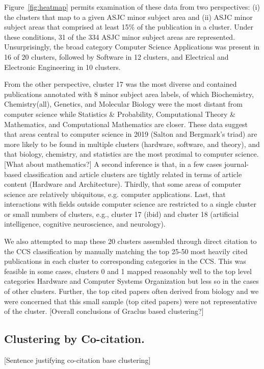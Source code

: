 Figure~\ref{fig:heatmap} permits examination of these data from two perspectives: (i) the clusters that map to a given ASJC minor subject area and (ii) ASJC minor subject areas that comprised at least 15\% of the publication in a cluster. Under these conditions, 31 of the 334 ASJC minor subject areas are represented. Unsurprisingly, the broad category Computer Science Applications was present in 16 of 20 clusters, followed by Software in 12 clusters, and Electrical and Electronic Engineering in 10 clusters. 

From the other perspective, cluster 17 was the most diverse and contained publications annotated with 8 minor subject area labels, of which Biochemistry, Chemistry(all), Genetics, and Molecular Biology were the most distant from computer science while Statistics \& Probability, Computational Theory \& Mathematics, and Computational Mathematics are closer.  These data suggest that areas central to computer science in 2019 (Salton and Bergmark's triad) are more likely to be found in multiple clusters (hardware, software, and theory), and that biology, chemistry, and statistics are the most proximal to computer science. [What about mathematics?]  A second inference is that, in a few cases journal-based classification and article clusters are tightly related in terms of article content (Hardware and Architecture). Thirdly, that some areas of computer science are relatively ubiquitous, e.g. computer applications. Last, that interactions with fields outside computer science are restricted to a single cluster or small numbers of clusters, e.g., cluster 17 (ibid) and cluster 18 (artificial intelligence, cognitive neuroscience, and neurology).

We also attempted to map these 20 clusters assembled through direct citation to the CCS classification by manually matching the top 25-50 most heavily cited publications in each cluster to corresponding categories in the CCS. This was feasible in some cases, clusters 0 and 1 mapped reasonably well to the top level categories Hardware and Computer Systems Organization but less so in the cases of other clusters. Further, the top cited papers often derived from biology and we were concerned that this small sample (top cited papers) were not representative of the cluster. [Overall conclusions of Graclus based clustering?]

\subsection{Clustering by Co-citation.} [Sentence justifying co-citation base clustering]

